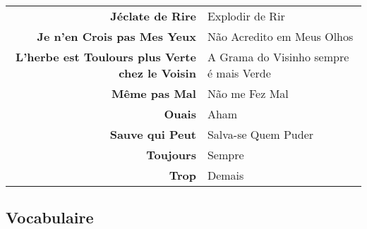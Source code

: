 \documentclass{article}
\begin{document}
\begin{center}
\begin{tabular}{r l}
                \textbf{Jéclate de Rire}                                & Explodir de Rir\\
                \textbf{Je n'en Crois pas Mes Yeux}                     & Não Acredito em Meus Olhos\\
                \textbf{L'herbe est Toulours plus Verte chez le Voisin} & A Grama do Visinho sempre é mais Verde\\
                \textbf{Même pas Mal}                                   & Não me Fez Mal\\
                \textbf{Ouais}                                          & Aham\\
                \textbf{Sauve qui Peut}                                 & Salva-se Quem Puder\\
                \textbf{Toujours}                                       & Sempre\\
                \textbf{Trop}                                           & Demais\\
            \end{tabular}
        \end{center}

    \subsection{Vocabulaire}
\newpage
\end{document}
